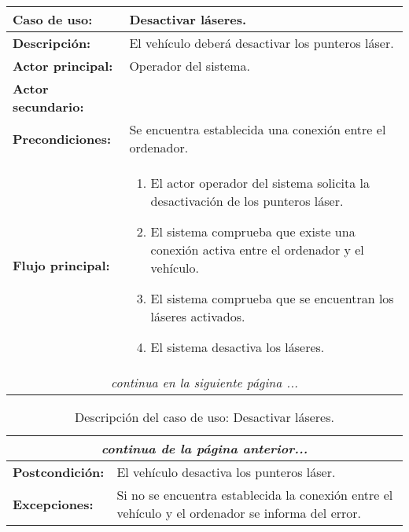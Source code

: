 \begin{table}[H]
  \begin{center}
    \begin{tabular}{|p{3.5cm}|p{10cm}|}
      \hline
      {\textbf{Caso de uso:}} & { Desactivar láseres.} \\
      \hline
      {\textbf{Descripción:}} & {El vehículo deberá desactivar los punteros láser.} \\
     \hline
      {\textbf{Actor principal:}} & { Operador del sistema.} \\
      \hline
      {\textbf{Actor secundario:}} & {}\\
      \hline
      {\textbf{Precondiciones:}} & { Se encuentra establecida una conexión entre el ordenador.} \\
     \hline 
     {\textbf{Flujo principal:}} & { 
       \begin{enumerate}
       \item El actor operador del sistema solicita la desactivación de los punteros láser.
       \item El sistema comprueba que existe una conexión activa entre el ordenador y el vehículo.
       \item El sistema comprueba que se encuentran los láseres activados.
       \item El sistema desactiva los láseres.
       \end{enumerate}
     } \\
     \hline
     \multicolumn{2}{c}{\emph{continua en la siguiente página ...}}\\
    \end{tabular}
  \end{center}
\end{table}    

\begin{table}[H]
  \begin{center}
    \begin{tabular}{|p{3.5cm}|p{10cm}|}
     \multicolumn{2}{c}{\emph{continua de la página anterior...}}\\
     \hline
     {\textbf{Postcondición:}} & { El vehículo desactiva los punteros láser.}\\
     \hline
     {\textbf{Excepciones:}} & {Si no se encuentra establecida la conexión entre el vehículo y el ordenador se informa del error.}\\        
     \hline
    \end{tabular}
  \end{center}
\caption{Descripción del caso de uso: Desactivar láseres.}
\end{table}





